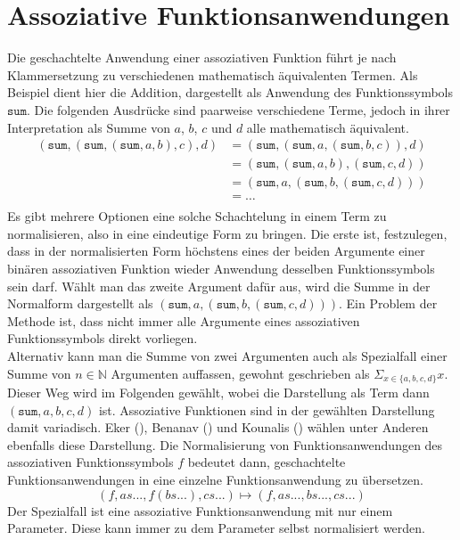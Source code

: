 \section {Assoziative Funktionsanwendungen}
Die geschachtelte Anwendung einer assoziativen Funktion führt je nach Klammersetzung zu verschiedenen mathematisch äquivalenten Termen. Als Beispiel dient hier die Addition, dargestellt als Anwendung des Funktionssymbols $\texttt{sum}$. Die folgenden Ausdrücke sind paarweise verschiedene Terme, jedoch in ihrer Interpretation als Summe von $a$, $b$, $c$ und $d$ alle mathematisch äquivalent.
\begin{equation*}
	\begin{split}
	   (\texttt{sum}, (\texttt{sum}, (\texttt{sum}, a, b), c), d) 
    &= (\texttt{sum}, (\texttt{sum}, a, (\texttt{sum}, b, c)), d)\\
	&= (\texttt{sum}, (\texttt{sum}, a, b), (\texttt{sum}, c, d))\\
	&= (\texttt{sum}, a, (\texttt{sum}, b, (\texttt{sum}, c, d)))\\
	&= \dots \\
	\end{split}
\end{equation*}
Es gibt mehrere Optionen eine solche Schachtelung in einem Term zu normalisieren, also in eine eindeutige Form zu bringen. Die erste ist, festzulegen, dass in der normalisierten Form höchstens eines der beiden Argumente einer binären assoziativen Funktion wieder Anwendung desselben Funktionssymbols sein darf. Wählt man das zweite Argument dafür aus, wird die Summe in der Normalform dargestellt als $(\texttt{sum}, a, (\texttt{sum}, b, (\texttt{sum}, c, d)))$. Ein Problem der Methode ist, dass nicht immer alle Argumente eines assoziativen Funktionssymbols direkt vorliegen.\\
Alternativ kann man die Summe von zwei Argumenten auch als Spezialfall einer Summe von $n \in \mathbb{N}$ Argumenten auffassen, gewohnt geschrieben als $\Sigma_{x \in \{a, b, c, d\}} x$. Dieser Weg wird im Folgenden gewählt, wobei die Darstellung als Term dann $(\texttt{sum}, a, b, c, d)$ ist. Assoziative Funktionen sind in der gewählten Darstellung damit variadisch. Eker (\cite{BipartiteGraphMatching}), Benanav (\cite{NPHardMatching}) und Kounalis (\cite{ACPatternCompiler}) wählen unter Anderen ebenfalls diese Darstellung. 
Die Normalisierung von Funktionsanwendungen des assoziativen Funktionssymbols $f$ bedeutet dann, geschachtelte Funktionsanwendungen in eine einzelne Funktionsanwendung zu übersetzen. 
$$(f, as..., f(bs...), cs...) \mapsto (f, as..., bs..., cs...)$$
Der Spezialfall ist eine assoziative Funktionsanwendung mit nur einem Parameter. Diese kann immer zu dem Parameter selbst normalisiert werden. 

